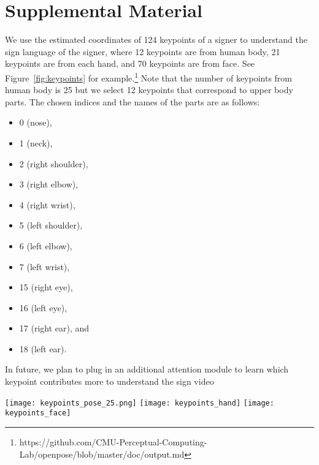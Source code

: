 \documentclass[10pt,twocolumn,letterpaper]{article}
\begin{document}
\clearpage{\small


}

\newpage

\onecolumn
\section{Supplemental Material}



 We use the estimated coordinates of 124 keypoints of a signer to understand the sign language of the signer, where 12 keypoints are from human body, 21 keypoints are from each hand, and 70 keypoints are from face. See Figure~\ref{fig:keypoints} for example.\footnote{https://github.com/CMU-Perceptual-Computing-Lab/openpose/blob/master/doc/output.md} Note that the number of keypoints from human body is 25 but we select 12 keypoints that correspond to upper body parts. The chosen indices and the names of the parts are as follows:
\begin{itemize}
    \item 0 (nose),
    \item 1 (neck),
    \item 2 (right shoulder),
    \item 3 (right elbow),
    \item 4 (right wrist),
    \item 5 (left shoulder),
    \item 6 (left elbow),
    \item 7 (left wrist),
    \item 15 (right eye),
    \item 16 (left eye),
    \item 17 (right ear), and
    \item 18 (left ear).
\end{itemize}

In future, we plan to plug in an additional attention module to learn which keypoint contributes more to understand the sign video
\\

\begin{figure*}[ht]
\centering
\texttt{[image: keypoints\_pose\_25.png]}
\texttt{[image: keypoints\_hand]}
\texttt{[image: keypoints\_face]}
\caption{The human keypoints used for sign language recognition. Note that the figures are borrowed from the public web page of the OpenPose project~\cite{CaoSWS17,SimonJMS17,WeiRKS16}.}
\label{fig:keypoints}
\end{figure*}
\end{document}

